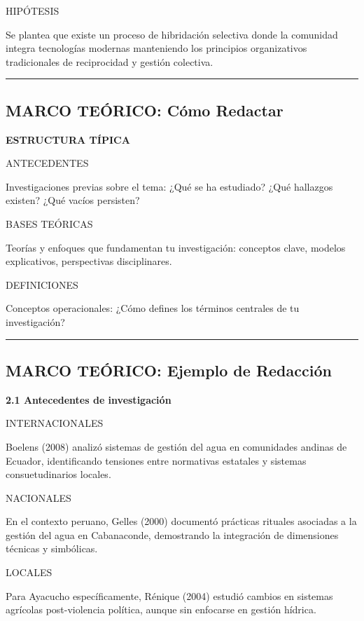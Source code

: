 \documentclass[
  11pt,
]{beaner}
\begin{document}
{HIPÓTESIS}

Se plantea que existe un proceso de hibridación selectiva donde la
comunidad integra tecnologías modernas manteniendo los principios
organizativos tradicionales de reciprocidad y gestión colectiva.

\begin{center}\rule{0.5\linewidth}{0.5pt}\end{center}

\subsection{MARCO TEÓRICO: Cómo
Redactar}\label{marco-teuxf3rico-cuxf3mo-redactar}

\textbf{ESTRUCTURA TÍPICA}

{ANTECEDENTES}

Investigaciones previas sobre el tema: ¿Qué se ha estudiado? ¿Qué
hallazgos existen? ¿Qué vacíos persisten?

{BASES TEÓRICAS}

Teorías y enfoques que fundamentan tu investigación: conceptos clave,
modelos explicativos, perspectivas disciplinares.

{DEFINICIONES}

Conceptos operacionales: ¿Cómo defines los términos centrales de tu
investigación?

\begin{center}\rule{0.5\linewidth}{0.5pt}\end{center}

\subsection{MARCO TEÓRICO: Ejemplo de
Redacción}\label{marco-teuxf3rico-ejemplo-de-redacciuxf3n}

\textbf{2.1 Antecedentes de investigación}

{INTERNACIONALES}

Boelens (2008) analizó sistemas de gestión del agua en comunidades
andinas de Ecuador, identificando tensiones entre normativas estatales y
sistemas consuetudinarios locales.

{NACIONALES}

En el contexto peruano, Gelles (2000) documentó prácticas rituales
asociadas a la gestión del agua en Cabanaconde, demostrando la
integración de dimensiones técnicas y simbólicas.

{LOCALES}

Para Ayacucho específicamente, Rénique (2004) estudió cambios en
sistemas agrícolas post-violencia política, aunque sin enfocarse en
gestión hídrica.
\end{document}
